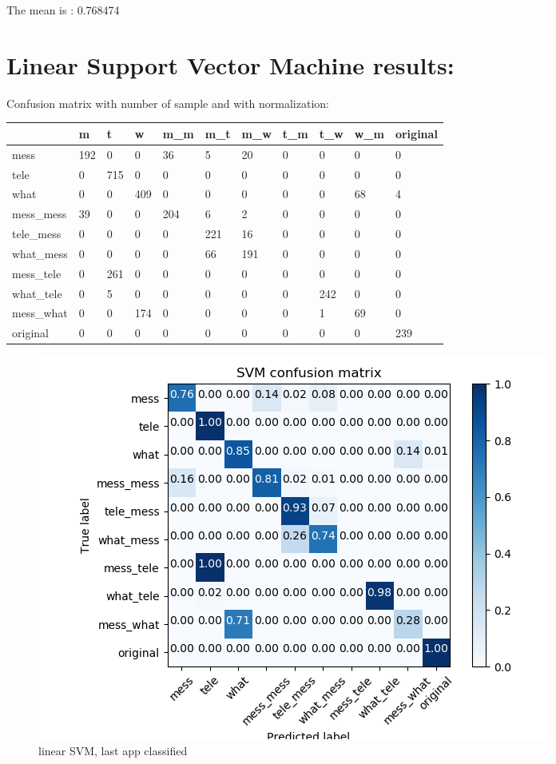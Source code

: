 The mean is : 0.768474\section{Linear Support Vector Machine results:} 
Confusion matrix with number of sample and with normalization:
 {\def\arraystretch{1.3} 
 \begin{table}[H] 
\centering 
\begin{tabular}{|l|l|l|l|l|l|l|l|l|l|l|} 
\hline 
  &m  &t  &w  &m\_m  &m\_t  &m\_w  &t\_m  &t\_w  &w\_m  &original  \\ \hline
mess  &192  &0  &0  &36  &5  &20  &0  &0  &0  &0  \\ \hline
tele  &0  &715  &0  &0  &0  &0  &0  &0  &0  &0  \\ \hline
what  &0  &0  &409  &0  &0  &0  &0  &0  &68  &4  \\ \hline
mess\_mess  &39  &0  &0  &204  &6  &2  &0  &0  &0  &0  \\ \hline
tele\_mess  &0  &0  &0  &0  &221  &16  &0  &0  &0  &0  \\ \hline
what\_mess  &0  &0  &0  &0  &66  &191  &0  &0  &0  &0  \\ \hline
mess\_tele  &0  &261  &0  &0  &0  &0  &0  &0  &0  &0  \\ \hline
what\_tele  &0  &5  &0  &0  &0  &0  &0  &242  &0  &0  \\ \hline
mess\_what  &0  &0  &174  &0  &0  &0  &0  &1  &69  &0  \\ \hline
original  &0  &0  &0  &0  &0  &0  &0  &0  &0  &239  \\ \hline
\end{tabular} 
\end{table} }

 \begin{figure}[H] 
\centering 
\includegraphics[scale=.6]{images/new_met_lsvm_initial_single_double_complete.png} 
\caption{linear SVM, last app classified} 
\end{figure} 


